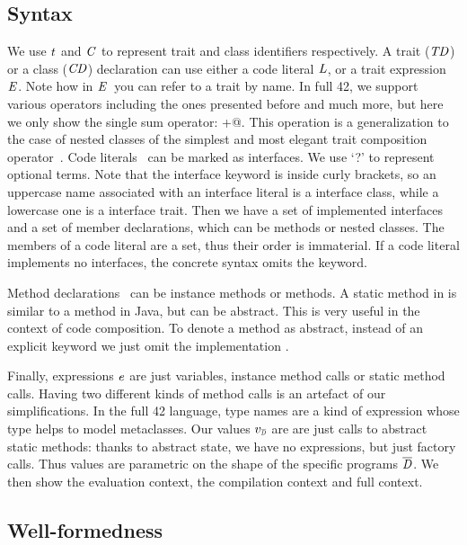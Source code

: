 \subsection{Syntax}

We use $\mathit{t}$ and $\mathit{C}$ to represent trait and class identifiers respectively.
A trait ($\mathit{TD}$) or a class ($\mathit{CD}$) declaration can use either a code literal $\mathit{L}$, or a trait
expression $\mathit{E}$. Note how in $\mathit{E}$\ you can refer to a trait by name.
In full 42, we support various operators including the ones presented before and much more,
 but here we only show the single sum operator: \Q@+@.
This operation is a generalization to the case of nested classes of the simplest and most elegant
trait composition operator~\cite{ducasse2006traits}.
Code literals \mL\ can be marked as interfaces. We use `?' to represent optional terms.
Note that the interface keyword is inside curly brackets,
so an uppercase name associated with an interface literal is a interface class, while a lowercase one is a interface trait.
Then we have a set of implemented interfaces and a set of member
declarations, which can be methods or nested classes.
The members of a code literal are a set, thus their order is immaterial.
If a code literal implements no interfaces, the concrete syntax omits the \Q@implements@ keyword.

Method declarations \mMD~can be instance methods or \Q@static@ methods. 
A static method in \name is similar to a \Q@static@ method in Java, but can be abstract.
This is very useful in the context of code composition.
To denote a method as abstract, instead of an explicit keyword we just omit the implementation \me.

Finally, expressions $\mathit{e}$ are just variables, instance method calls or static method calls.
Having two different kinds of method calls is an artefact of our simplifications.
In the full 42 language, type names are a kind of expression whose type helps to model metaclasses.
Our values $v_{{\smallDs}}$ are
are just calls to abstract static methods:
thanks to abstract state, we have no \Q@new@ expressions, but just factory calls.
Thus values are parametric on the shape of the specific programs $\overline{\mathit{D}}$.
We then show the evaluation context, the compilation context and full
context.

\subsection{Well-formedness}

